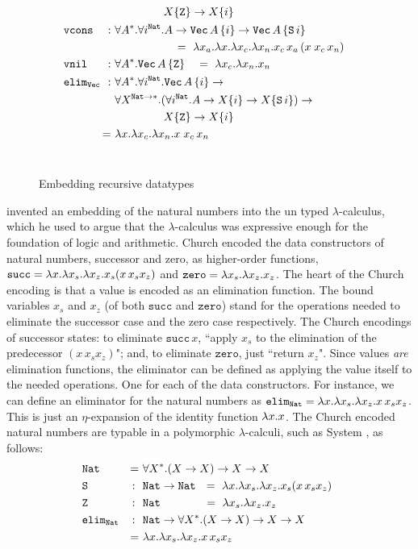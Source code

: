 \begin{figure}
\begin{align*}
&&& \qquad~\qquad X\{\texttt{Z}\} -> X\{i\} \\
 &\!\!\!\!\!\!\texttt{vcons} &\!\!\!\!\!\!\!\!:~& \forall A^{*}.\forall i^\mathtt{Nat}.A-> \mathtt{Vec}\,A\,\{i\}-> \mathtt{Vec}\,A\,\{\mathtt{S}\,i\} \\
&&&\;\qquad\qquad\quad =~ \l x_a.\l x.\l x_c.\l x_n. x_c\,x_a\,(x\;x_c\,x_n) \\
&\!\!\!\!\!\!\mathtt{vnil} &\!\!\!\!\!\!\!\!:~& \forall A^{*}.\texttt{Vec}\,A\,\{\mathtt{Z}\} 
~~~=~ \l x_c.\l x_n.x_n \\
&\!\!\!\!\!\!\mathtt{elim_{Vec}} &\!\!\!\!\!\!\!\!:~& \forall A^{*}.\forall i^\mathtt{Nat}.\texttt{Vec}\,A\,\{i\} -> \\
&&& \forall X^{\mathtt{Nat}-> *}.(\forall i^\mathtt{Nat}.A -> X\{i\} -> X\{\mathtt{S}\,i\}) -> \\
&&& \qquad~\qquad X\{\mathtt{Z}\} -> X\{i\} \\
& &\!\!\!\!\!=~& \l x.\l x_c. \l x_n.x\;x_c\,x_n
\end{align*} ~\vspace*{-14pt}
\caption{Embedding recursive datatypes}
\label{fig:churchrec}
\end{figure}
\citet{Church33} invented an embedding of the natural numbers into
the un typed $\lambda$-calculus, which he used to argue
that the $\lambda$-calculus was expressive enough for the foundation of
logic and arithmetic. Church encoded the data constructors of natural numbers,
successor and zero, as higher-order functions,
$\mathtt{succ}=\lambda x.\lambda x_s.\lambda x_z.x_s(x\,x_s x_z)$ and
$\mathtt{zero}=\lambda x_s.\lambda x_z.x_z$.
The heart of the Church encoding is that a value is encoded as an elimination function.
The bound variables $x_s$ and $x_z$ (of both $\mathtt{succ}$ and $\mathtt{zero}$) stand for the operations needed to
eliminate the successor case and the zero case respectively. The Church encodings of
successor states: to eliminate $\mathtt{succ}\,x$, ``apply $x_s$
to the elimination of the predecessor $(x\,x_s x_z)$"; and,
to eliminate $\mathtt{zero}$, just ``return $x_z$".
Since values {\it are} elimination functions, the
eliminator can be defined as applying the value itself to the needed operations. One
for each of the data constructors. 
For instance, we can define an eliminator
for the natural numbers as $\mathtt{elim_{Nat}}=\lambda x.\lambda x_s.\lambda x_z.x\,x_s x_z$.
This is just an $\eta$-expansion of the identity function $\lambda x.x$.
The Church encoded natural numbers are typable in a polymorphic $\lambda$-calculi,
such as System \Fw, as follows:\vspace*{-2pt}
\begin{align*}
&\texttt{Nat} &=~& \forall X^{*}.(X -> X) -> X -> X \qquad\qquad\qquad\\
&\texttt{S} &\!\!\!:~~& \texttt{Nat} -> \texttt{Nat}
	~~ =~ \l x.\l x_s.\l x_z.x_s(x\,x_s x_z) \\
&\texttt{Z} &\!\!\!:~~& \texttt{Nat} \qquad\quad\,
	~~ =~ \l x_s.\l x_z.x_z \\
&\mathtt{elim_{Nat}} &\!\!\!:~~& \texttt{Nat} -> \forall X^{*}.(X -> X)-> X-> X \\
& &=~& \l x.\l x_s.\l x_z.x\,x_s x_z
\end{align*}~\vspace*{-13pt}


